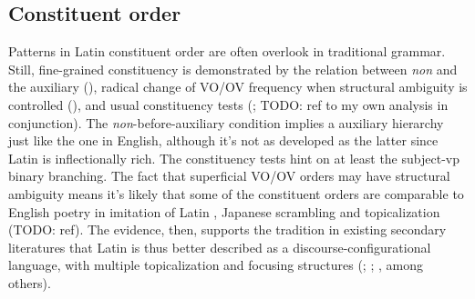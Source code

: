 \documentclass[a4paper, oneside]{report}
\newcommand*{\citesec}[1]{\S~{#1}}
\newcommand*{\citepage}[1]{p.~{#1}}
\newcommand{\form}[1]{\emph{#1}}
\begin{document}
\subsection{Constituent order}\label{sec:constituent-order-abs}

Patterns in Latin constituent order are often overlook in traditional grammar.
Still, fine-grained constituency is demonstrated by 
the relation between \form{non} and the auxiliary 
(),
radical change of VO/OV frequency when structural ambiguity is controlled
(),
and usual constituency tests 
(\citealt[\citesec{1.6}]{danckaert2017development}; TODO: ref to my own analysis in conjunction).
The \form{non}-before-auxiliary condition implies 
a auxiliary hierarchy just like the one in English, 
although it's not as developed as the latter 
since Latin is inflectionally rich.
The constituency tests hint on 
at least the subject-\acs{vp} binary branching.
The fact that superficial VO/OV orders may have structural ambiguity 
means it's likely that some of the constituent orders 
are comparable to
English poetry in imitation of Latin \citep[\citesec{600}]{allen1903allen},
Japanese scrambling and topicalization (TODO: ref).
The evidence, then, supports the tradition in existing secondary literatures that
Latin is thus better described as a discourse-configurational language,
with multiple topicalization and focusing structures
(\citealt[\citepage{189}]{oniga2014latin}; 
\citealt[\citepage{77}]{danckaert2017development}; 
\citealt{devine2006latin}, among others).
\end{document}
